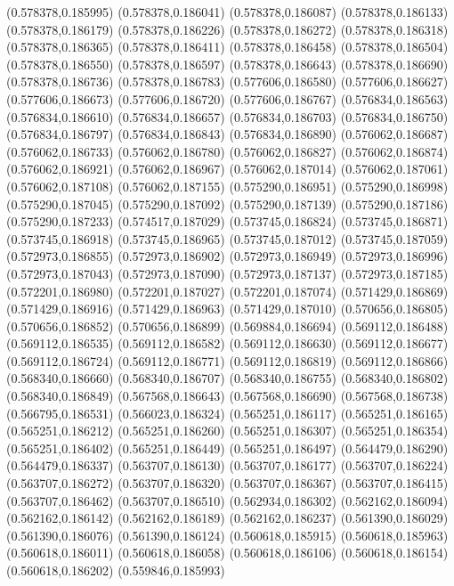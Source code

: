 (0.578378,0.185995)
(0.578378,0.186041)
(0.578378,0.186087)
(0.578378,0.186133)
(0.578378,0.186179)
(0.578378,0.186226)
(0.578378,0.186272)
(0.578378,0.186318)
(0.578378,0.186365)
(0.578378,0.186411)
(0.578378,0.186458)
(0.578378,0.186504)
(0.578378,0.186550)
(0.578378,0.186597)
(0.578378,0.186643)
(0.578378,0.186690)
(0.578378,0.186736)
(0.578378,0.186783)
(0.577606,0.186580)
(0.577606,0.186627)
(0.577606,0.186673)
(0.577606,0.186720)
(0.577606,0.186767)
(0.576834,0.186563)
(0.576834,0.186610)
(0.576834,0.186657)
(0.576834,0.186703)
(0.576834,0.186750)
(0.576834,0.186797)
(0.576834,0.186843)
(0.576834,0.186890)
(0.576062,0.186687)
(0.576062,0.186733)
(0.576062,0.186780)
(0.576062,0.186827)
(0.576062,0.186874)
(0.576062,0.186921)
(0.576062,0.186967)
(0.576062,0.187014)
(0.576062,0.187061)
(0.576062,0.187108)
(0.576062,0.187155)
(0.575290,0.186951)
(0.575290,0.186998)
(0.575290,0.187045)
(0.575290,0.187092)
(0.575290,0.187139)
(0.575290,0.187186)
(0.575290,0.187233)
(0.574517,0.187029)
(0.573745,0.186824)
(0.573745,0.186871)
(0.573745,0.186918)
(0.573745,0.186965)
(0.573745,0.187012)
(0.573745,0.187059)
(0.572973,0.186855)
(0.572973,0.186902)
(0.572973,0.186949)
(0.572973,0.186996)
(0.572973,0.187043)
(0.572973,0.187090)
(0.572973,0.187137)
(0.572973,0.187185)
(0.572201,0.186980)
(0.572201,0.187027)
(0.572201,0.187074)
(0.571429,0.186869)
(0.571429,0.186916)
(0.571429,0.186963)
(0.571429,0.187010)
(0.570656,0.186805)
(0.570656,0.186852)
(0.570656,0.186899)
(0.569884,0.186694)
(0.569112,0.186488)
(0.569112,0.186535)
(0.569112,0.186582)
(0.569112,0.186630)
(0.569112,0.186677)
(0.569112,0.186724)
(0.569112,0.186771)
(0.569112,0.186819)
(0.569112,0.186866)
(0.568340,0.186660)
(0.568340,0.186707)
(0.568340,0.186755)
(0.568340,0.186802)
(0.568340,0.186849)
(0.567568,0.186643)
(0.567568,0.186690)
(0.567568,0.186738)
(0.566795,0.186531)
(0.566023,0.186324)
(0.565251,0.186117)
(0.565251,0.186165)
(0.565251,0.186212)
(0.565251,0.186260)
(0.565251,0.186307)
(0.565251,0.186354)
(0.565251,0.186402)
(0.565251,0.186449)
(0.565251,0.186497)
(0.564479,0.186290)
(0.564479,0.186337)
(0.563707,0.186130)
(0.563707,0.186177)
(0.563707,0.186224)
(0.563707,0.186272)
(0.563707,0.186320)
(0.563707,0.186367)
(0.563707,0.186415)
(0.563707,0.186462)
(0.563707,0.186510)
(0.562934,0.186302)
(0.562162,0.186094)
(0.562162,0.186142)
(0.562162,0.186189)
(0.562162,0.186237)
(0.561390,0.186029)
(0.561390,0.186076)
(0.561390,0.186124)
(0.560618,0.185915)
(0.560618,0.185963)
(0.560618,0.186011)
(0.560618,0.186058)
(0.560618,0.186106)
(0.560618,0.186154)
(0.560618,0.186202)
(0.559846,0.185993)
